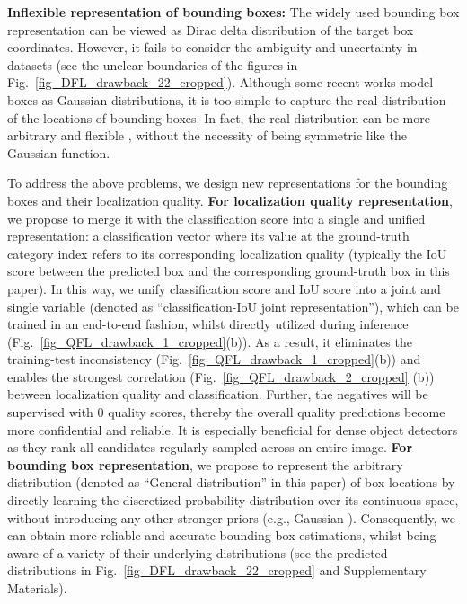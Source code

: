 \documentclass{article}
\begin{document}
\textbf{Inflexible representation of bounding boxes:} The widely used bounding box representation can be viewed as Dirac delta distribution \cite{girshick2015fast,ren2015faster,he2017mask,cai2018cascade,lin2017focal,tian2019fcos,kong2019foveabox,zhang2019bridging} of the target box coordinates. However, it fails to consider the ambiguity and uncertainty in datasets (see the unclear boundaries of the figures in Fig.~\ref{fig_DFL_drawback_22_cropped}). 
Although some recent works \cite{he2019bounding,choi2019gaussian} model boxes as Gaussian distributions, it is too simple to capture the real distribution of the locations of bounding boxes. In fact, the real distribution can be more arbitrary and flexible \cite{he2019bounding}, without the necessity of being symmetric like the Gaussian function.





To address the above problems, we design new representations for the bounding boxes and their localization quality. \textbf{For localization quality representation}, we propose to merge it with the classification score into a single and unified representation: a classification vector where its value at the ground-truth category index refers to its corresponding localization quality (typically the IoU score between the predicted box and the corresponding ground-truth box in this paper). In this way, we unify classification score and IoU score into a joint and single variable (denoted as ``classification-IoU joint representation''),
which can be trained in an end-to-end fashion, whilst directly utilized during inference (Fig.~\ref{fig_QFL_drawback_1_cropped}(b)). As a result, it eliminates the training-test inconsistency (Fig.~\ref{fig_QFL_drawback_1_cropped}(b)) and enables the strongest correlation (Fig.~\ref{fig_QFL_drawback_2_cropped} (b)) between localization quality and classification. Further, the negatives will be supervised with 0 quality scores, thereby the overall quality predictions become more confidential and reliable. It is especially beneficial for dense object detectors as they rank all candidates regularly sampled across an entire image. \textbf{For bounding box representation}, we propose to represent the arbitrary distribution (denoted as ``General distribution'' in this paper) of box locations by directly learning the discretized probability distribution over its continuous space, without introducing any other stronger priors (e.g., Gaussian \cite{he2019bounding, choi2019gaussian}).
Consequently, we can obtain more reliable and accurate bounding box estimations, whilst being aware of a variety of their underlying distributions (see the predicted distributions in Fig.~\ref{fig_DFL_drawback_22_cropped} and Supplementary Materials).
\end{document}
